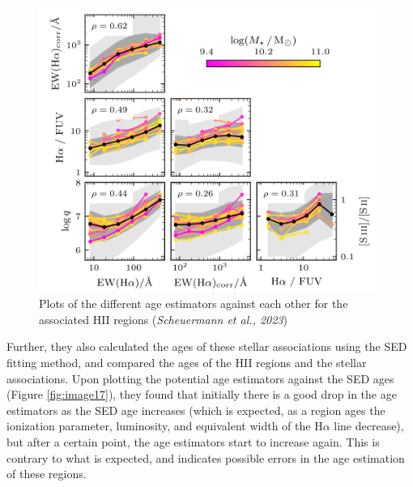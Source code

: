 \documentclass[12pt]{report}
\begin{document}
\begin{figure}[htbp]
    \centering
    \includegraphics[scale = 0.45]{image16.png}
    \caption{Plots of the different age estimators against each other for the associated HII regions (\textit{Scheuermann et al., 2023})}
    \label{fig:image16}
\end{figure}

Further, they also calculated the ages of these stellar associations using the SED fitting method, and compared the ages of the HII regions and the stellar associations. Upon plotting the potential age estimators against the SED ages (Figure \ref{fig:image17}), they found that initially there is a good drop in the age estimators as the SED age increases (which is expected, as a region ages the ionization parameter, luminosity, and equivalent width of the H$\alpha$ line decrease), but after a certain point, the age estimators start to increase again. This is contrary to what is expected, and indicates possible errors in the age estimation of these regions. 
\end{document}

